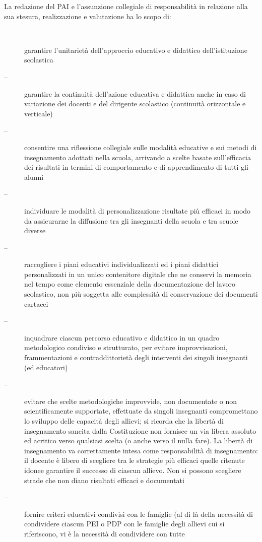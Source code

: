 \begin{description}
\begin{enumerate}
		La redazione del PAI e l'assunzione collegiale di responsabilità in relazione alla sua stesura,
		realizzazione e valutazione ha lo scopo di:
		\begin{description}
			\item[--] garantire l'unitarietà dell'approccio educativo e didattico dell'istituzione scolastica
			\item[--] garantire la continuità dell'azione educativa e didattica anche in caso di variazione dei docenti
			e del dirigente scolastico (continuità orizzontale e verticale)
			\item[--] consentire una riflessione collegiale sulle modalità educative e sui metodi di insegnamento
			adottati nella scuola, arrivando a scelte basate sull'efficacia dei risultati in termini di
			comportamento e di apprendimento di tutti gli alunni
			\item[--] individuare le modalità di personalizzazione risultate più efficaci in modo da assicurarne la
			diffusione tra gli insegnanti della scuola e tra scuole diverse
			\item[--] raccogliere i piani educativi individualizzati ed i piani didattici personalizzati in un unico
			contenitore digitale che ne conservi la memoria nel tempo come elemento essenziale della
			documentazione del lavoro scolastico, non più soggetta alle complessità di conservazione dei
			documenti cartacei
			\item[--] inquadrare ciascun percorso educativo e didattico in un quadro metodologico condiviso e
			strutturato, per evitare improvvisazioni, frammentazioni e contraddittorietà degli interventi
			dei singoli insegnanti (ed educatori)
			\item[--] evitare che scelte metodologiche improvvide, non documentate o non scientificamente
			supportate, effettuate da singoli insegnanti compromettano lo sviluppo delle capacità degli
			allievi; si ricorda che la libertà di insegnamento sancita dalla Costituzione non fornisce un via
			libera assoluto ed acritico verso qualsiasi scelta (o anche verso il nulla fare). La libertà di
			insegnamento va correttamente intesa come responsabilità di insegnamento: il docente è
			libero di scegliere tra le strategie più efficaci quelle ritenute idonee garantire il successo di
			ciascun allievo. Non si possono scegliere strade che non diano risultati efficaci e documentati
			\item[--] fornire criteri educativi condivisi con le famiglie (al di là della necessità di condividere ciascun
			PEI o PDP con le famiglie degli allievi cui si riferiscono, vi è la necessità di condividere con tutte

\end{description}
\end{enumerate}
\end{description}
